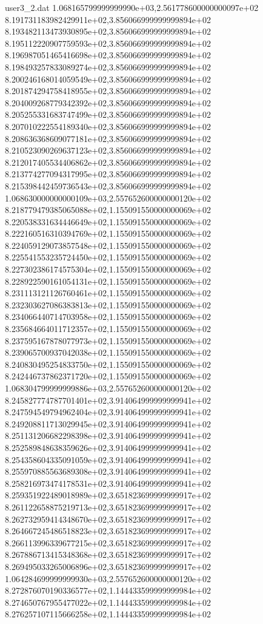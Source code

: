\begin{filecontents}{user3_2.dat}
1.068165799999999990e+03,2.561778600000000097e+02
8.191731183982429911e+02,3.856066999999999894e+02
8.193482113473930895e+02,3.856066999999999894e+02
8.195112220907759593e+02,3.856066999999999894e+02
8.196987051465416698e+02,3.856066999999999894e+02
8.198493257833089274e+02,3.856066999999999894e+02
8.200246168014059549e+02,3.856066999999999894e+02
8.201874294758418955e+02,3.856066999999999894e+02
8.204009268779342392e+02,3.856066999999999894e+02
8.205255331683747499e+02,3.856066999999999894e+02
8.207010222554189340e+02,3.856066999999999894e+02
8.208636368609077181e+02,3.856066999999999894e+02
8.210523090269637123e+02,3.856066999999999894e+02
8.212017405534406862e+02,3.856066999999999894e+02
8.213774277094317995e+02,3.856066999999999894e+02
8.215398442459736543e+02,3.856066999999999894e+02
1.068630000000000109e+03,2.557652600000000120e+02
8.218779479385065088e+02,1.155091550000000069e+02
8.220538331634446649e+02,1.155091550000000069e+02
8.222160516310394769e+02,1.155091550000000069e+02
8.224059129073857548e+02,1.155091550000000069e+02
8.225541553235724450e+02,1.155091550000000069e+02
8.227302386174575304e+02,1.155091550000000069e+02
8.228922590161054131e+02,1.155091550000000069e+02
8.231113121126760461e+02,1.155091550000000069e+02
8.232303627086383813e+02,1.155091550000000069e+02
8.234066440714703958e+02,1.155091550000000069e+02
8.235684664011712357e+02,1.155091550000000069e+02
8.237595167878077973e+02,1.155091550000000069e+02
8.239065700937042038e+02,1.155091550000000069e+02
8.240830495254833750e+02,1.155091550000000069e+02
8.242446737862371720e+02,1.155091550000000069e+02
1.068304799999999886e+03,2.557652600000000120e+02
8.245827774787701401e+02,3.914064999999999941e+02
8.247594549794962404e+02,3.914064999999999941e+02
8.249208811713029945e+02,3.914064999999999941e+02
8.251131206682298398e+02,3.914064999999999941e+02
8.252589848638359626e+02,3.914064999999999941e+02
8.254358604335091059e+02,3.914064999999999941e+02
8.255970885563689308e+02,3.914064999999999941e+02
8.258216973474178531e+02,3.914064999999999941e+02
8.259351922489018989e+02,3.651823699999999917e+02
8.261122658875219713e+02,3.651823699999999917e+02
8.262732959414348670e+02,3.651823699999999917e+02
8.264667245486518823e+02,3.651823699999999917e+02
8.266113996339677215e+02,3.651823699999999917e+02
8.267886713415348368e+02,3.651823699999999917e+02
8.269495033265006896e+02,3.651823699999999917e+02
1.064284699999999930e+03,2.557652600000000120e+02
8.272876070190336577e+02,1.144433599999999984e+02
8.274650767955477022e+02,1.144433599999999984e+02
8.276257107115666258e+02,1.144433599999999984e+02

\end{filecontents}
